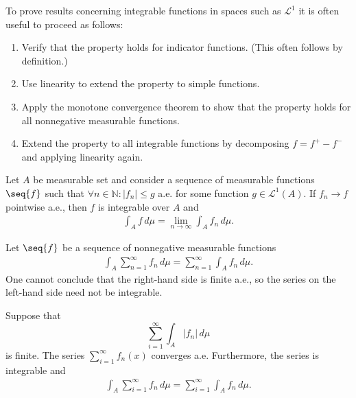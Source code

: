     \begin{method}\label{lebesgue:linear_proofs}
        To prove results concerning integrable functions in spaces such as $\mathcal{L}^1$ it is often useful to proceed as follows:
        \begin{enumerate}
            \item Verify that the property holds for indicator functions. (This often follows by definition.)
            \item Use linearity to extend the property to simple functions.
            \item Apply the monotone convergence theorem to show that the property holds for all nonnegative measurable functions.
            \item Extend the property to all integrable functions by decomposing $f = f^+-f^-$ and applying linearity again.
        \end{enumerate}
    \end{method}

    \begin{theorem}\label{lebesgue:dominated_convergence_theorem}
        Let $A$ be measurable set and consider a sequence of measurable functions $\seq{f}$ such that $\forall n\in\mathbb{N}:|f_n|\leq g$ a.e. for some function $g\in\mathcal{L}^1(A)$. If $f_n\rightarrow f$ pointwise a.e., then $f$ is integrable over $A$ and
        \begin{gather}
            \int_Af\,d\mu = \lim_{n\rightarrow\infty}\int_Af_n\,d\mu.
        \end{gather}
    \end{theorem}

    \begin{property}
        Let $\seq{f}$ be a sequence of nonnegative measurable functions
        \begin{gather}
            \int_A\sum_{n=1}^\infty f_n\,d\mu = \sum_{n=1}^\infty\int_Af_n\,d\mu.
        \end{gather}
        One cannot conclude that the right-hand side is finite a.e., so the series on the left-hand side need not be integrable.
    \end{property}

    \begin{theorem}\label{lebesgue:beppo_levi}
        Suppose that \[\sum_{i=1}^\infty\int_A|f_n|\,d\mu\] is finite. The series $\sum_{i=1}^\infty f_n(x)$ converges a.e. Furthermore, the series is integrable and
        \begin{gather}
            \int_A\sum_{i=1}^\infty f_n\,d\mu = \sum_{i=1}^\infty\int_Af_n\,d\mu.
        \end{gather}
    \end{theorem}

